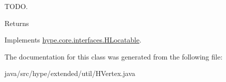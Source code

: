T\-O\-D\-O. 

\begin{DoxyReturn}{Returns}

\end{DoxyReturn}


Implements \hyperlink{interfacehype_1_1core_1_1interfaces_1_1_h_locatable_a39eb12015a40fe494f789607dec9c484}{hype.\-core.\-interfaces.\-H\-Locatable}.



The documentation for this class was generated from the following file\-:\begin{DoxyCompactItemize}
\item 
java/src/hype/extended/util/H\-Vertex.\-java\end{DoxyCompactItemize}
